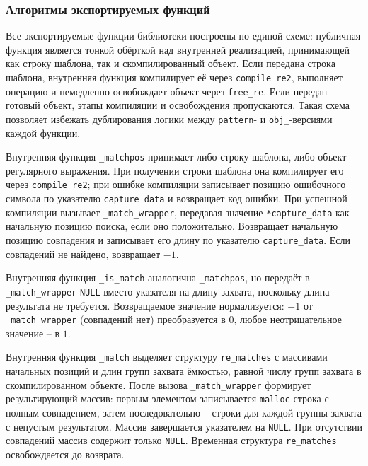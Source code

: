 \subsubsection{Алгоритмы экспортируемых функций}

Все экспортируемые функции библиотеки построены по единой схеме: публичная функция является тонкой обёрткой над внутренней реализацией, принимающей как строку шаблона, так и скомпилированный объект. Если передана строка шаблона, внутренняя функция компилирует её через \verb`compile_re2`, выполняет операцию и немедленно освобождает объект через \verb`free_re`. Если передан готовый объект, этапы компиляции и освобождения пропускаются. Такая схема позволяет избежать дублирования логики между \verb`pattern`- и \verb`obj_`-версиями каждой функции.


Внутренняя функция \verb`_matchpos` принимает либо строку шаблона, либо объект регулярного выражения. При получении строки шаблона она компилирует его через \verb`compile_re2`; при ошибке компиляции записывает позицию ошибочного символа по указателю \verb`capture_data` и возвращает код ошибки. При успешной компиляции вызывает \verb`_match_wrapper`, передавая значение \verb`*capture_data` как начальную позицию поиска, если оно положительно. Возвращает начальную позицию совпадения и записывает его длину по указателю \verb`capture_data`. Если совпадений не найдено, возвращает $-1$.


Внутренняя функция \verb`_is_match` аналогична \verb`_matchpos`, но передаёт в \verb`_match_wrapper` \verb`NULL` вместо указателя на длину захвата, поскольку длина результата не требуется. Возвращаемое значение нормализуется: $-1$ от \verb`_match_wrapper` (совпадений нет) преобразуется в $0$, любое неотрицательное значение -- в $1$.


Внутренняя функция \verb`_match` выделяет структуру \verb`re_matches` с массивами начальных позиций и длин групп захвата ёмкостью, равной числу групп захвата в скомпилированном объекте. После вызова \verb`_match_wrapper` формирует результирующий массив: первым элементом записывается \verb`malloc`-строка с полным совпадением, затем последовательно -- строки для каждой группы захвата с непустым результатом. Массив завершается указателем на \verb`NULL`. При отсутствии совпадений массив содержит только \verb`NULL`. Временная структура \verb`re_matches` освобождается до возврата.

